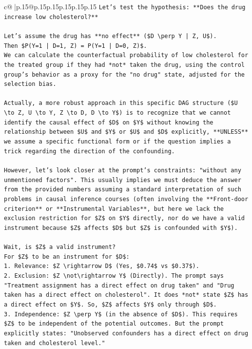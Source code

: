 \documentclass{article}
\begin{document}
{\begin{supertabular}{c@{$\;$}|p{.15\linewidth}@{}p{.15\linewidth}p{.15\linewidth}p{.15\linewidth}p{.15\linewidth}p{.15\linewidth}}
{{{\texttt{Let's test the hypothesis: **Does the drug increase low cholesterol?**} \\
\\ 
\texttt{Let's assume the drug has **no effect** (\$D \textbackslash{}perp Y | Z, U\$).} \\
\texttt{Then \$P(Y=1 | D=1, Z) = P(Y=1 | D=0, Z)\$.} \\
\texttt{We can calculate the counterfactual probability of low cholesterol for the treated group if they had *not* taken the drug, using the control group's behavior as a proxy for the "no drug" state, adjusted for the selection bias.} \\
\\ 
\texttt{Actually, a more robust approach in this specific DAG structure (\$U \textbackslash{}to Z, U \textbackslash{}to Y, Z \textbackslash{}to D, D \textbackslash{}to Y\$) is to recognize that we cannot identify the causal effect of \$D\$ on \$Y\$ without knowing the relationship between \$U\$ and \$Y\$ or \$U\$ and \$D\$ explicitly, **UNLESS** we assume a specific functional form or if the question implies a trick regarding the direction of the confounding.} \\
\\ 
\texttt{However, let's look closer at the prompt's constraints: "without any unmentioned factors". This usually implies we must deduce the answer from the provided numbers assuming a standard interpretation of such problems in causal inference courses (often involving the **Front{-}door criterion** or **Instrumental Variables**, but here we lack the exclusion restriction for \$Z\$ on \$Y\$ directly, nor do we have a valid instrument because \$Z\$ affects \$D\$ but \$Z\$ is confounded with \$Y\$).} \\
\\ 
\texttt{Wait, is \$Z\$ a valid instrument?} \\
\texttt{For \$Z\$ to be an instrument for \$D\$:} \\
\texttt{1.  Relevance: \$Z \textbackslash{}rightarrow D\$ (Yes, \$0.74\$ vs \$0.37\$).} \\
\texttt{2.  Exclusion: \$Z \textbackslash{}not\textbackslash{}rightarrow Y\$ (Directly). The prompt says "Treatment assignment has a direct effect on drug taken" and "Drug taken has a direct effect on cholesterol". It does *not* state \$Z\$ has a direct effect on \$Y\$. So, \$Z\$ affects \$Y\$ only through \$D\$.} \\
\texttt{3.  Independence: \$Z \textbackslash{}perp Y\$ (in the absence of \$D\$). This requires \$Z\$ to be independent of the potential outcomes. But the prompt explicitly states: "Unobserved confounders has a direct effect on drug taken and cholesterol level."} \\
}}}
\end{supertabular}}
\end{document}

